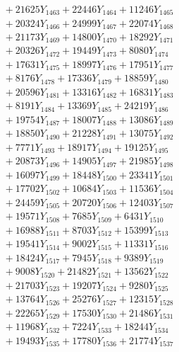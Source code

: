 \documentclass[a4paper,10pt]{article}
\begin{document}
{\begin{align}
&\;  + 21625 Y_{1463} + 22446 Y_{1464} + 11246 Y_{1465} \\[0.3ex]
&\;  + 20324 Y_{1466} + 24999 Y_{1467} + 22074 Y_{1468} \\[0.5ex]\allowbreak
&\;  + 21173 Y_{1469} + 14800 Y_{1470} + 18292 Y_{1471} \\[0.3ex]
&\;  + 20326 Y_{1472} + 19449 Y_{1473} + 8080 Y_{1474} \\[0.3ex]
&\;  + 17631 Y_{1475} + 18997 Y_{1476} + 17951 Y_{1477} \\[0.3ex]
&\;  + 8176 Y_{1478} + 17336 Y_{1479} + 18859 Y_{1480} \\[0.3ex]
&\;  + 20596 Y_{1481} + 13316 Y_{1482} + 16831 Y_{1483} \\[0.3ex]
&\;  + 8191 Y_{1484} + 13369 Y_{1485} + 24219 Y_{1486} \\[0.3ex]
&\;  + 19754 Y_{1487} + 18007 Y_{1488} + 13086 Y_{1489} \\[0.3ex]
&\;  + 18850 Y_{1490} + 21228 Y_{1491} + 13075 Y_{1492} \\[0.3ex]
&\;  + 7771 Y_{1493} + 18917 Y_{1494} + 19125 Y_{1495} \\[0.3ex]
&\;  + 20873 Y_{1496} + 14905 Y_{1497} + 21985 Y_{1498} \\[0.5ex]\allowbreak
&\;  + 16097 Y_{1499} + 18448 Y_{1500} + 23341 Y_{1501} \\[0.3ex]
&\;  + 17702 Y_{1502} + 10684 Y_{1503} + 11536 Y_{1504} \\[0.3ex]
&\;  + 24459 Y_{1505} + 20720 Y_{1506} + 12403 Y_{1507} \\[0.3ex]
&\;  + 19571 Y_{1508} + 7685 Y_{1509} + 6431 Y_{1510} \\[0.3ex]
&\;  + 16988 Y_{1511} + 8703 Y_{1512} + 15399 Y_{1513} \\[0.3ex]
&\;  + 19541 Y_{1514} + 9002 Y_{1515} + 11331 Y_{1516} \\[0.3ex]
&\;  + 18424 Y_{1517} + 7945 Y_{1518} + 9389 Y_{1519} \\[0.3ex]
&\;  + 9008 Y_{1520} + 21482 Y_{1521} + 13562 Y_{1522} \\[0.3ex]
&\;  + 21703 Y_{1523} + 19207 Y_{1524} + 9280 Y_{1525} \\[0.3ex]
&\;  + 13764 Y_{1526} + 25276 Y_{1527} + 12315 Y_{1528} \\[0.5ex]\allowbreak
&\;  + 22265 Y_{1529} + 17530 Y_{1530} + 21486 Y_{1531} \\[0.3ex]
&\;  + 11968 Y_{1532} + 7224 Y_{1533} + 18244 Y_{1534} \\[0.3ex]
&\;  + 19493 Y_{1535} + 17780 Y_{1536} + 21774 Y_{1537} \\[0.3ex]

\end{align}}
\end{document}
